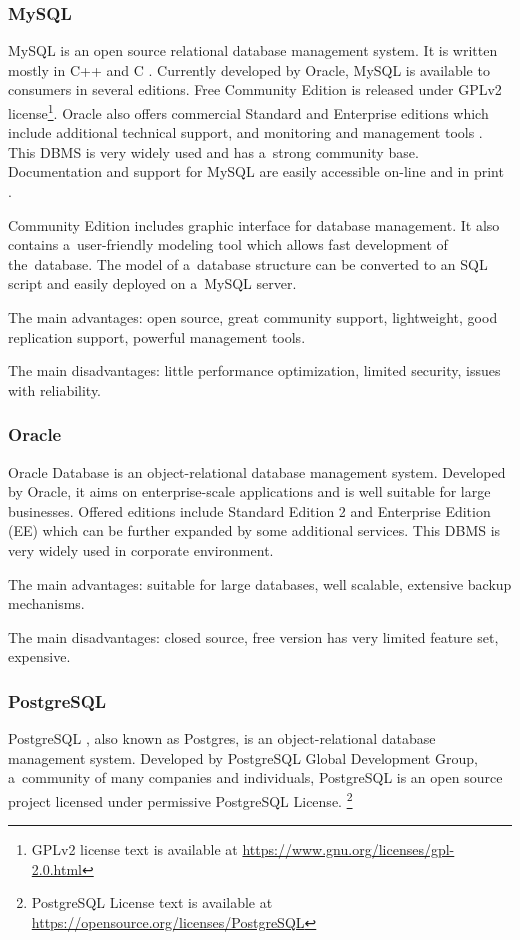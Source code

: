 		\subsubsection*{MySQL}
		MySQL \cite{mysql} is an open source relational database management system. It is written mostly in C++ and C \cite{mysqllanguage}.  Currently developed by Oracle, MySQL is available to consumers in several editions. Free Community Edition is released under GPLv2 license\footnote{GPLv2 license text is available at \url{https://www.gnu.org/licenses/gpl-2.0.html}}. Oracle also offers commercial Standard and Enterprise editions which include additional technical support, and monitoring and management tools \cite{mysqleditions}. This DBMS is very widely used and has a~strong community base. Documentation and support for MySQL are easily accessible on-line and in print \cite{mysqlbook}. 
		
		Community Edition includes graphic interface for database management. It also contains a~user-friendly modeling tool which allows fast development of the~database. The model of a~database structure can be converted to an SQL script and easily deployed on a~MySQL server.
		
		The main advantages: open source, great community support, lightweight, good replication support, powerful management tools.
		
		The main disadvantages: little performance optimization, limited security,  issues with reliability.
		
		\subsubsection*{Oracle}
		Oracle Database \cite{oracledb} is an object-relational database management system. Developed by Oracle, it aims on enterprise-scale applications and is well suitable for large businesses. Offered editions include Standard Edition 2 and Enterprise Edition (EE) which can be further expanded by some additional services. This DBMS is very widely used in corporate environment.
		
		The main advantages: suitable for large databases, well scalable, extensive backup mechanisms.
		
		The main disadvantages: closed source, free version has very limited feature set, expensive.
		 
		\subsubsection*{PostgreSQL}
		PostgreSQL \cite{postgres}, also known as Postgres, is an object-relational database management system. Developed by PostgreSQL Global Development Group, a~community of many companies and individuals, PostgreSQL is an open source project licensed under permissive PostgreSQL License. \footnote{PostgreSQL License text is available at \url{https://opensource.org/licenses/PostgreSQL}}
		
